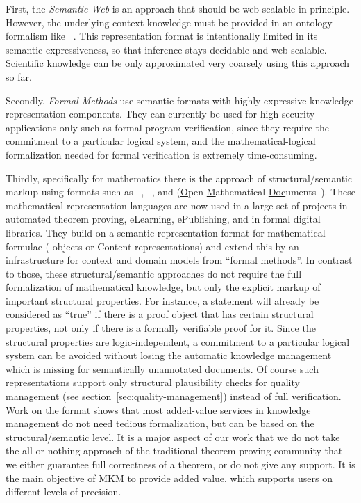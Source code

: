 \documentclass{llncs}
\def\owl{\sc{Owl}}
\def\mathml{\sc{MathML}}
\def\openmath{\sc{OpenMath}}
\def\omdoc{\sc{OMDoc}}
\begin{document}
First, the {\emph{Semantic Web}} is an approach that should be web-scalable in
principle.  However, the underlying context knowledge must be provided in an ontology
formalism like {\owl}~\cite{McGvHa:owl04}. This representation format is intentionally
limited in its semantic expressiveness, so that inference stays decidable and
web-scalable. Scientific knowledge can be only approximated very coarsely using this
approach so far.

Secondly, {\emph{Formal Methods}} use semantic formats with highly expressive
knowledge representation components. They can currently be used for high-security
applications only such as formal program verification, since they require the commitment
to a particular logical system, and the mathematical-logical formalization needed for
formal verification is extremely time-consuming.

Thirdly, specifically for mathematics there is the approach of structural/semantic markup
using formats such as {\openmath}~\cite{BusCapCar:2oms04},
{\mathml}~\cite{CarIon:MathML03}, and {\omdoc} ({\underline{O}}pen
{\underline{M}}athematical
{\underline{Doc}}uments~\cite{DBLP:conf/aisc/Kohlhase00,Kohlhase:omfmd05}). These
mathematical representation languages are now used in a large set of projects in automated
theorem proving, eLearning, ePublishing, and in formal digital libraries. They build on a
semantic representation format for mathematical formulae ({\openmath} objects or Content
{\mathml} representations) and extend this by an infrastructure for context and domain
models from ``formal methods''. In contrast to those, these structural/semantic approaches
do not require the full formalization of mathematical knowledge, but only the explicit
markup of important structural properties. For instance, a statement will already be
considered as ``true'' if there is a proof object that has certain structural properties,
not only if there is a formally verifiable proof for it. Since the structural properties
are logic-independent, a commitment to a particular logical system can be avoided without
losing the automatic knowledge management which is missing for semantically unannotated
documents. Of course such representations support only structural plausibility checks for
quality management (see section~\ref{sec:quality-management}) instead of full
verification. Work on the {\omdoc} format shows that most added-value services in
knowledge management do not need tedious formalization, but can be based on the
structural/semantic level. It is a major aspect of our work that we do not take the
all-or-nothing approach of the traditional theorem proving community that we either
guarantee full correctness of a theorem, or do not give any support. It is the main
objective of MKM to provide added value, which supports users on different levels of
precision.
\end{document}
